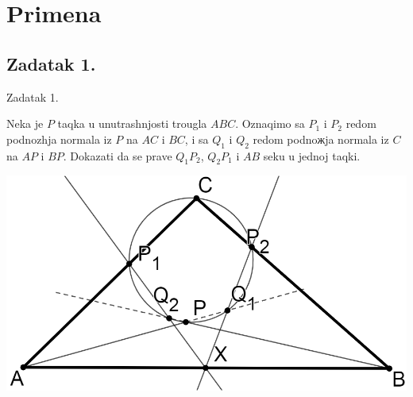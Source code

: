 \documentclass{beamer}
\begin{document}
\section{Primena}
\subsection{Zadatak 1.}
\begin{frame}{Zadatak 1.}
\begin{block}{}
Neka je $P$ taqka u unutrashnjosti trougla $ABC$. Oznaqimo sa $P_1$ i $P_2$ redom podnozhja
normala iz $P$ na $AC$ i $BC$, i sa $Q_1$ i $Q_2$ redom podnoжja normala iz $C$ na $AP$ i $BP$.
Dokazati da se prave $Q_1P_2$, $Q_2P_1$ i $AB$ seku u jednoj taqki.
\end{block}
\centering \includegraphics[scale=0.25]{Paskal1}
\end{frame}
\end{document}
